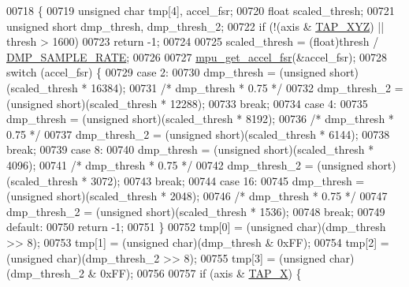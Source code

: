 \begin{DoxyCode}
00718 \{
00719     \textcolor{keywordtype}{unsigned} \textcolor{keywordtype}{char} tmp[4], accel\_fsr;
00720     \textcolor{keywordtype}{float} scaled\_thresh;
00721     \textcolor{keywordtype}{unsigned} \textcolor{keywordtype}{short} dmp\_thresh, dmp\_thresh\_2;
00722     \textcolor{keywordflow}{if} (!(axis & \hyperlink{group___d_r_i_v_e_r_s_gaa2b8e1661eb53aeac3ff4877ff2b79d9}{TAP\_XYZ}) || thresh > 1600)
00723         \textcolor{keywordflow}{return} -1;
00724 
00725     scaled\_thresh = (float)thresh / \hyperlink{group___d_r_i_v_e_r_s_ga9d0f0425cbcb58186500cb8686e41e67}{DMP\_SAMPLE\_RATE};
00726 
00727     \hyperlink{group___d_r_i_v_e_r_s_gab6087a15ee23db23b6aec41590329a60}{mpu\_get\_accel\_fsr}(&accel\_fsr);
00728     \textcolor{keywordflow}{switch} (accel\_fsr) \{
00729     \textcolor{keywordflow}{case} 2:
00730         dmp\_thresh = (\textcolor{keywordtype}{unsigned} short)(scaled\_thresh * 16384);
00731         \textcolor{comment}{/* dmp\_thresh * 0.75 */}
00732         dmp\_thresh\_2 = (\textcolor{keywordtype}{unsigned} short)(scaled\_thresh * 12288);
00733         \textcolor{keywordflow}{break};
00734     \textcolor{keywordflow}{case} 4:
00735         dmp\_thresh = (\textcolor{keywordtype}{unsigned} short)(scaled\_thresh * 8192);
00736         \textcolor{comment}{/* dmp\_thresh * 0.75 */}
00737         dmp\_thresh\_2 = (\textcolor{keywordtype}{unsigned} short)(scaled\_thresh * 6144);
00738         \textcolor{keywordflow}{break};
00739     \textcolor{keywordflow}{case} 8:
00740         dmp\_thresh = (\textcolor{keywordtype}{unsigned} short)(scaled\_thresh * 4096);
00741         \textcolor{comment}{/* dmp\_thresh * 0.75 */}
00742         dmp\_thresh\_2 = (\textcolor{keywordtype}{unsigned} short)(scaled\_thresh * 3072);
00743         \textcolor{keywordflow}{break};
00744     \textcolor{keywordflow}{case} 16:
00745         dmp\_thresh = (\textcolor{keywordtype}{unsigned} short)(scaled\_thresh * 2048);
00746         \textcolor{comment}{/* dmp\_thresh * 0.75 */}
00747         dmp\_thresh\_2 = (\textcolor{keywordtype}{unsigned} short)(scaled\_thresh * 1536);
00748         \textcolor{keywordflow}{break};
00749     \textcolor{keywordflow}{default}:
00750         \textcolor{keywordflow}{return} -1;
00751     \}
00752     tmp[0] = (\textcolor{keywordtype}{unsigned} char)(dmp\_thresh >> 8);
00753     tmp[1] = (\textcolor{keywordtype}{unsigned} char)(dmp\_thresh & 0xFF);
00754     tmp[2] = (\textcolor{keywordtype}{unsigned} char)(dmp\_thresh\_2 >> 8);
00755     tmp[3] = (\textcolor{keywordtype}{unsigned} char)(dmp\_thresh\_2 & 0xFF);
00756 
00757     \textcolor{keywordflow}{if} (axis & \hyperlink{group___d_r_i_v_e_r_s_ga22a5ea75ee18a788b441f66fffe83586}{TAP\_X}) \{

\end{DoxyCode}
